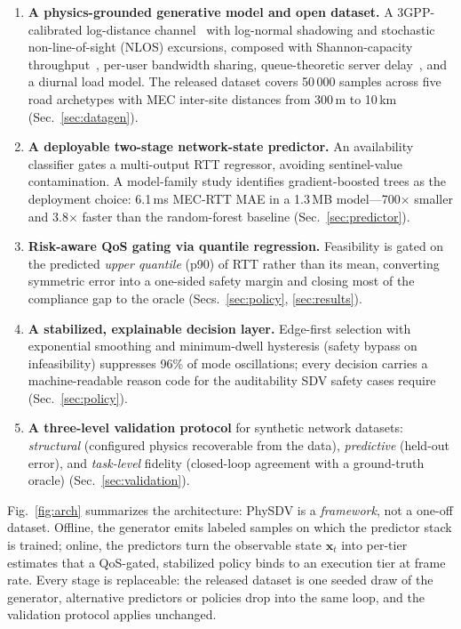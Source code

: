 \documentclass[10pt,conference]{IEEEtran}
\begin{document}
\begin{enumerate}
  \item \textbf{A physics-grounded generative model and open dataset.}
        A 3GPP-calibrated log-distance channel~\cite{3gpp38901} with
        log-normal shadowing and stochastic non-line-of-sight (NLOS)
        excursions, composed with Shannon-capacity
        throughput~\cite{shannon1948}, per-user bandwidth sharing,
        queue-theoretic server delay~\cite{kleinrock}, and a diurnal load
        model.  The released dataset covers 50\,000 samples across five
        road archetypes with MEC inter-site distances from 300\,m to
        10\,km (Sec.~\ref{sec:datagen}).
  \item \textbf{A deployable two-stage network-state predictor.}
        An availability classifier gates a multi-output RTT regressor,
        avoiding sentinel-value contamination.  A model-family study
        identifies gradient-boosted trees as the deployment choice:
        6.1\,ms MEC-RTT MAE in a 1.3\,MB model---700$\times$ smaller and
        3.8$\times$ faster than the random-forest baseline
        (Sec.~\ref{sec:predictor}).
  \item \textbf{Risk-aware QoS gating via quantile regression.}
        Feasibility is gated on the predicted \emph{upper quantile}
        (p90) of RTT rather than its mean, converting symmetric error
        into a one-sided safety margin and closing most of the
        compliance gap to the oracle (Secs.~\ref{sec:policy},
        \ref{sec:results}).
  \item \textbf{A stabilized, explainable decision layer.}  Edge-first
        selection with exponential smoothing and minimum-dwell
        hysteresis (safety bypass on infeasibility) suppresses 96\% of
        mode oscillations; every decision carries a machine-readable
        reason code for the auditability SDV safety cases require
        (Sec.~\ref{sec:policy}).
  \item \textbf{A three-level validation protocol} for synthetic
        network datasets: \emph{structural} (configured physics
        recoverable from the data), \emph{predictive} (held-out error),
        and \emph{task-level} fidelity (closed-loop agreement with a
        ground-truth oracle) (Sec.~\ref{sec:validation}).
\end{enumerate}

Fig.~\ref{fig:arch} summarizes the architecture: PhySDV is a
\emph{framework}, not a one-off dataset.  Offline, the generator emits
labeled samples on which the predictor stack is trained; online, the
predictors turn the observable state $\mathbf{x}_t$ into per-tier
estimates that a QoS-gated, stabilized policy binds to an execution
tier at frame rate.  Every stage is replaceable: the released dataset
is one seeded draw of the generator, alternative predictors or policies
drop into the same loop, and the validation protocol applies unchanged.
\end{document}

